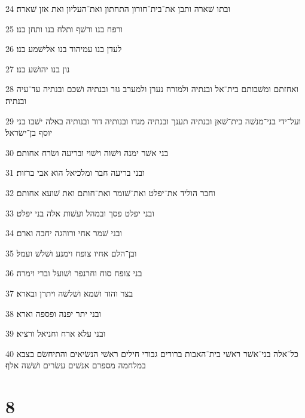 \par 24 ובתו שׁארה ותבן את־בית־חורון התחתון ואת־העליון ואת אזן שׁארה׃
\par 25 ורפח בנו ורשׁף ותלח בנו ותחן בנו׃
\par 26 לעדן בנו עמיהוד בנו אלישׁמע בנו׃
\par 27 נון בנו יהושׁע בנו׃
\par 28 ואחזתם ומשׁבותם בית־אל ובנתיה ולמזרח נערן ולמערב גזר ובנתיה ושׁכם ובנתיה עד־עיה ובנתיה׃
\par 29 ועל־ידי בני־מנשׁה בית־שׁאן ובנתיה תענך ובנתיה מגדו ובנותיה דור ובנותיה באלה ישׁבו בני יוסף בן־ישׂראל׃
\par 30 בני אשׁר ימנה וישׁוה וישׁוי ובריעה ושׂרח אחותם׃
\par 31 ובני בריעה חבר ומלכיאל הוא אבי ברזות׃
\par 32 וחבר הוליד את־יפלט ואת־שׁומר ואת־חותם ואת שׁועא אחותם׃
\par 33 ובני יפלט פסך ובמהל ועשׁות אלה בני יפלט׃
\par 34 ובני שׁמר אחי ורוהגה יחבה וארם׃
\par 35 ובן־הלם אחיו צופח וימנע ושׁלשׁ ועמל׃
\par 36 בני צופח סוח וחרנפר ושׁועל וברי וימרה׃
\par 37 בצר והוד ושׁמא ושׁלשׁה ויתרן ובארא׃
\par 38 ובני יתר יפנה ופספה וארא׃
\par 39 ובני עלא ארח וחניאל ורציא׃
\par 40 כל־אלה בני־אשׁר ראשׁי בית־האבות ברורים גבורי חילים ראשׁי הנשׂיאים והתיחשׂם בצבא במלחמה מספרם אנשׁים עשׂרים ושׁשׁה אלף׃

\chapter{8}

